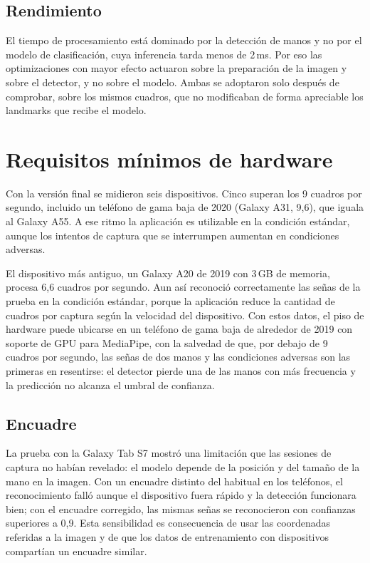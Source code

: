 \subsection{Rendimiento}

El tiempo de procesamiento está dominado por la detección de manos y no por el modelo de clasificación, cuya inferencia tarda menos de 2\,ms. Por eso las optimizaciones con mayor efecto actuaron sobre la preparación de la imagen y sobre el detector, y no sobre el modelo. Ambas se adoptaron solo después de comprobar, sobre los mismos cuadros, que no modificaban de forma apreciable los landmarks que recibe el modelo.

\section{Requisitos mínimos de hardware}

Con la versión final se midieron seis dispositivos. Cinco superan los 9 cuadros por segundo, incluido un teléfono de gama baja de 2020 (Galaxy A31, 9,6), que iguala al Galaxy A55. A ese ritmo la aplicación es utilizable en la condición estándar, aunque los intentos de captura que se interrumpen aumentan en condiciones adversas.

El dispositivo más antiguo, un Galaxy A20 de 2019 con 3\,GB de memoria, procesa 6,6 cuadros por segundo. Aun así reconoció correctamente las señas de la prueba en la condición estándar, porque la aplicación reduce la cantidad de cuadros por captura según la velocidad del dispositivo. Con estos datos, el piso de hardware puede ubicarse en un teléfono de gama baja de alrededor de 2019 con soporte de GPU para MediaPipe, con la salvedad de que, por debajo de 9 cuadros por segundo, las señas de dos manos y las condiciones adversas son las primeras en resentirse: el detector pierde una de las manos con más frecuencia y la predicción no alcanza el umbral de confianza.

\subsection{Encuadre}

La prueba con la Galaxy Tab S7 mostró una limitación que las sesiones de captura no habían revelado: el modelo depende de la posición y del tamaño de la mano en la imagen. Con un encuadre distinto del habitual en los teléfonos, el reconocimiento falló aunque el dispositivo fuera rápido y la detección funcionara bien; con el encuadre corregido, las mismas señas se reconocieron con confianzas superiores a 0,9. Esta sensibilidad es consecuencia de usar las coordenadas referidas a la imagen y de que los datos de entrenamiento con dispositivos compartían un encuadre similar.

